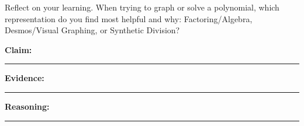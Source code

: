\documentclass[10pt]{article}
\newcommand{\writespace}[1]{\vspace{#1}}
\newcommand{\blankline}{\rule{1.5in}{0.4pt}}
\begin{document}
\vspace{6pt}

\begin{cerbox}
Reflect on your learning. When trying to graph or solve a polynomial, which representation do you find most helpful and why: Factoring/Algebra, Desmos/Visual Graphing, or Synthetic Division?

\vspace{6pt}
\textbf{Claim:} \blankline

\vspace{4pt}
\textbf{Evidence:} \blankline

\vspace{4pt}
\textbf{Reasoning:} \blankline

\writespace{20pt}
\end{cerbox}
\end{document}
